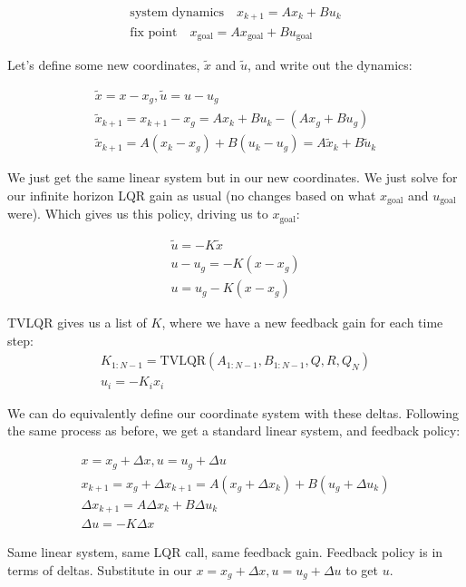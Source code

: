 \begin{gather*}
    \text{system dynamics} \quad x_{k+1} =Ax_{k} +Bu_{k}\\
    \text{fix point} \quad x_{\text{goal}} =Ax_{\text{goal}} +Bu_{\text{goal}}
\end{gather*}

Let's define some new coordinates, $\tilde{x}$ and $\tilde{u}$, and write out the dynamics:

\begin{gather*}
    \tilde{x} =x-x_{g} ,\tilde{u} =u-u_{g}\\
    \tilde{x}_{k+1} =x_{k+1} -x_{g} =Ax_{k} +Bu_{k} -( Ax_{g} +Bu_{g})\\
    \tilde{x}_{k+1} =A( x_{k} -x_{g}) +B( u_{k} -u_{g}) =A\tilde{x}_{k} +B\tilde{u}_{k}
\end{gather*}

We just get the same linear system but in our new coordinates. We just solve for our infinite horizon LQR gain as usual (no changes based on what $x_{\text{goal}}$ and $u_{\text{goal}}$ were). Which gives us this policy, driving us to $x_{\text{goal}}$:

\begin{gather*}
    \tilde{u} =-K\tilde{x}\\
    u-u_{g} =-K( x-x_{g})\\
    u=u_{g} -K( x-x_{g})
\end{gather*}

TVLQR gives us a list of $K$, where we have a new feedback gain for each time step:
\begin{gather*}
    K_{1:N-1}=\text{TVLQR}(A_{1:N-1}, B_{1:N-1}, Q, R, Q_N)\\
    u_i=-K_ix_i
\end{gather*}

We can do equivalently define our coordinate system with these deltas. Following the same process as before, we get a standard linear system, and feedback policy:

\begin{gather*}
    x=x_{g} +\Delta x,u=u_{g} +\Delta u\\
    x_{k+1} =x_{g} +\Delta x_{k+1} =A( x_{g} +\Delta x_{k}) +B( u_{g} +\Delta u_{k})\\
    \Delta x_{k+1} =A\Delta x_{k} +B\Delta u_{k}\\
    \Delta u = -K\Delta x
\end{gather*}

Same linear system, same LQR call, same feedback gain. Feedback policy is in terms of deltas. Substitute in our $x=x_{g} +\Delta x,u=u_{g} +\Delta u$ to get $u$.

